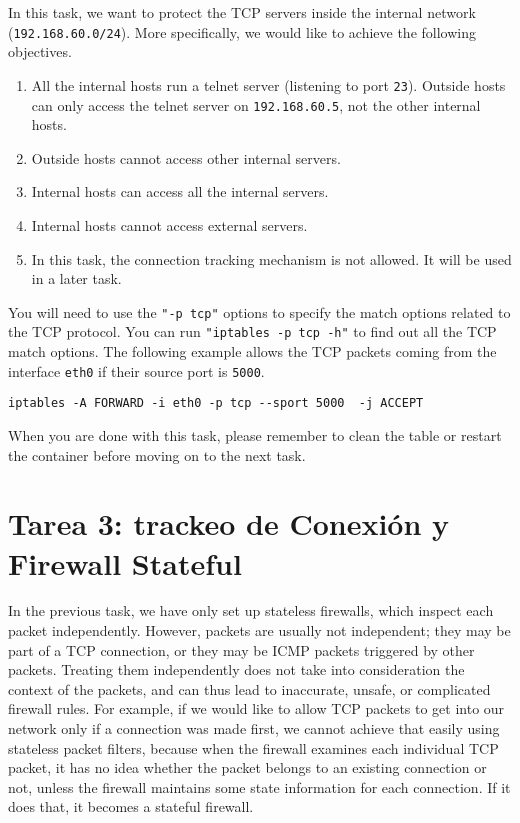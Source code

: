 In this task, we want to protect the TCP servers 
inside the internal network (\texttt{192.168.60.0/24}). 
More specifically, we would like to achieve the following objectives.

\begin{enumerate}[noitemsep]
  \item All the internal hosts run a telnet server (listening to port \texttt{23}). 
    Outside hosts can only access the telnet server on \texttt{192.168.60.5},
    not the other internal hosts.

  \item Outside hosts cannot access other internal servers. 

  \item Internal hosts can access all the internal servers.

  \item Internal hosts cannot access external servers.

  \item In this task, the connection tracking mechanism is not allowed. 
    It will be used in a later task. 
\end{enumerate}

You will need to use the \texttt{"-p tcp"} options to specify the match
options related to the TCP protocol. You can run 
\texttt{"iptables -p tcp -h"} to find out all the TCP match
options. The following example allows the TCP packets coming from
the interface \texttt{eth0} if their source port is \texttt{5000}.  

\begin{lstlisting}
iptables -A FORWARD -i eth0 -p tcp --sport 5000  -j ACCEPT
\end{lstlisting}


When you are done with this task,
please remember to clean the table or restart the container 
before moving on to the next task.




\section{Tarea 3: trackeo de Conexión y Firewall Stateful}


In the previous task, we have only set up stateless firewalls, which inspect each
packet independently. However, packets
are usually not independent; they may be part of a TCP connection,
or they may be ICMP packets triggered by other packets. Treating them
independently does not take into consideration the context of the
packets, and can thus lead to inaccurate, unsafe, or complicated firewall rules.
For example, if we would like to allow TCP packets to get into our network
only if a connection was made first, we cannot achieve that easily 
using stateless packet filters, because when the firewall examines each individual TCP packet,
it has no idea whether the packet belongs to an existing connection
or not, unless the firewall maintains some state information for each connection.
If it does that, it becomes a stateful firewall.


